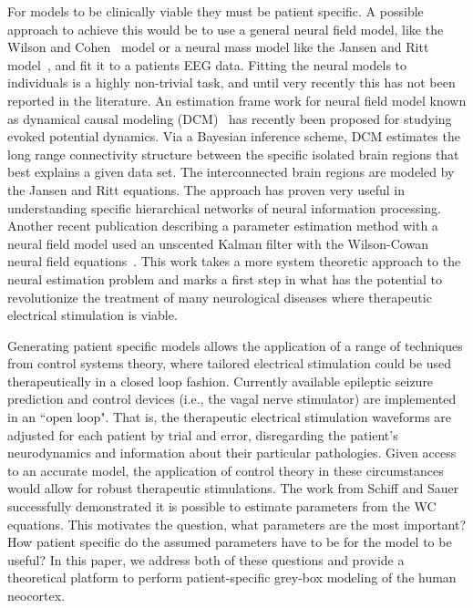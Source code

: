 \documentclass[onecolumn,draftcls]{IEEEtran}
\begin{document}
For models to be clinically viable they must be patient specific. A possible approach to achieve this would be to use a general neural field model, like the Wilson and Cohen~\cite{Wilson1973} model or a neural mass model like the Jansen and Ritt model~\cite{Jansen1995}, and fit it to a patients EEG data. Fitting the neural models to individuals is a highly non-trivial task, and until very recently this has not been reported in the literature. An estimation frame work for neural field model known as dynamical causal modeling (DCM)~\cite{David2003} \cite{David2006} has recently been proposed for studying evoked potential dynamics. Via a Bayesian inference scheme, DCM estimates the long range connectivity structure between the specific isolated brain regions that best explains a given data set. The interconnected brain regions are modeled by the Jansen and Ritt equations. The approach has proven very useful in understanding specific hierarchical networks of neural information processing. Another recent publication describing a parameter estimation method with a neural field model used an unscented Kalman filter with the Wilson-Cowan neural field equations~\cite{schiff2008kalman}.  This work takes a more system theoretic approach to the neural estimation problem and marks a first step in what has the potential to revolutionize the treatment of many neurological diseases where therapeutic electrical stimulation is viable.

Generating patient specific models allows the application of a range of techniques from control systems theory, where tailored electrical stimulation could be used therapeutically in a closed loop fashion.  Currently available epileptic seizure prediction and control devices (i.e., the vagal nerve stimulator) are implemented in an ``open loop".  That is, the therapeutic electrical stimulation waveforms are adjusted for each patient by trial and error, disregarding the patient's neurodynamics and information about their particular pathologies. Given access to an accurate model, the application of control theory in these circumstances would allow for robust therapeutic stimulations.
The work from Schiff and Sauer~\cite{schiff2008kalman} successfully demonstrated  it is possible to estimate parameters from the WC equations. This motivates the question, what parameters are the most important? How patient specific do the assumed parameters have to be for the model to be useful? In this paper, we address both of these questions and provide a theoretical platform to perform patient-specific grey-box modeling of the human neocortex.
\end{document}
